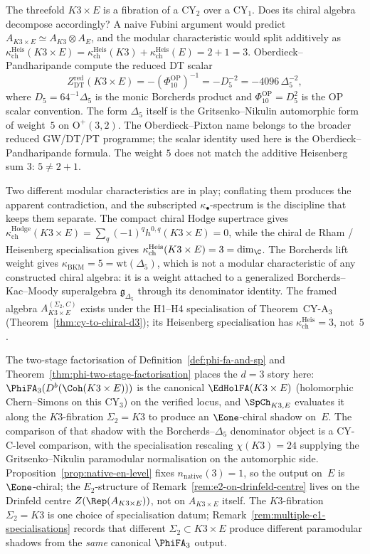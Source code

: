 The threefold $K3 \times E$ is a fibration of a CY$_2$ over a CY$_1$. Does its chiral algebra decompose accordingly? A naive Fubini argument would predict $A_{K3 \times E} \simeq A_{K3} \otimes A_E$, and the modular characteristic would split additively as $\kappa_{\mathrm{ch}}^{\mathrm{Heis}}(K3 \times E) = \kappa_{\mathrm{ch}}^{\mathrm{Heis}}(K3) + \kappa_{\mathrm{ch}}^{\mathrm{Heis}}(E) = 2 + 1 = 3$. Oberdieck--Pandharipande compute the reduced DT scalar
\[
 Z^{\mathrm{red}}_{\mathrm{DT}}(K3\times E)
 =
 -(\Phi_{10}^{\mathrm{OP}})^{-1}
 =
 -D_5^{-2}
 =
 -4096\,\Delta_5^{-2},
\]
where \(D_5=64^{-1}\Delta_5\) is the monic Borcherds product and
\(\Phi_{10}^{\mathrm{OP}}=D_5^2\) is the OP scalar convention. The form
\(\Delta_5\) itself is the Gritsenko--Nikulin automorphic form of
weight~$5$ on $\mathrm{O}^+(3,2)$. The Oberdieck--Pixton name belongs
to the broader reduced GW/DT/PT programme; the scalar identity used
here is the Oberdieck--Pandharipande formula. The weight $5$ does not
match the additive Heisenberg sum $3$: $5 \neq 2 + 1$.

Two different modular characteristics are in play; conflating them produces the apparent contradiction, and the subscripted $\kappa_\bullet$-spectrum is the discipline that keeps them separate. The compact chiral Hodge supertrace gives $\kappa_{\mathrm{ch}}^{\mathrm{Hodge}}(K3 \times E) = \sum_q (-1)^q h^{0, q}(K3 \times E) = 0$, while the chiral de Rham / Heisenberg specialisation gives $\kappa_{\mathrm{ch}}^{\mathrm{Heis}}(K3 \times E) = 3 = \dim_\C$. The Borcherds lift weight gives $\kappa_{\mathrm{BKM}} = 5 = \mathrm{wt}(\Delta_5)$, which is not a modular characteristic of any constructed chiral algebra: it is a weight attached to a generalized Borcherds--Kac--Moody superalgebra $\mathfrak{g}_{\Delta_5}$ through its denominator identity. The framed algebra $A_{K3 \times E}^{(\Sigma_2,C)}$ exists under the H1--H4 specialisation of Theorem~CY-A$_3$ (Theorem~\ref{thm:cy-to-chiral-d3}); its Heisenberg specialisation has $\kappa_{\mathrm{ch}}^{\mathrm{Heis}} = 3$, not~$5$.

The two-stage factorisation of Definition~\ref{def:phi-fa-and-sp} and Theorem~\ref{thm:phi-two-stage-factorisation} places the $d = 3$ story here: $\PhiFA_3(D^b(\Coh(K3 \times E)))$ is the canonical $\EdHolFA(K3 \times E)$ (holomorphic Chern--Simons on this CY$_3$) on the verified locus, and $\SpCh_{K3, E}$ evaluates it along the $K3$-fibration $\Sigma_2 = K3$ to produce an $\Eone$-chiral shadow on~$E$. The comparison of that shadow with the Borcherds--$\Delta_5$ denominator object is a CY-C-level comparison, with the specialisation rescaling $\chi(K3) = 24$ supplying the Gritsenko--Nikulin paramodular normalisation on the automorphic side. Proposition~\ref{prop:native-en-level} fixes $n_{\mathrm{native}}(3) = 1$, so the output on~$E$ is $\Eone$-chiral; the $E_2$-structure of Remark~\ref{rem:e2-on-drinfeld-centre} lives on the Drinfeld centre $Z(\Rep(A_{K3\times E}))$, not on $A_{K3 \times E}$ itself. The $K3$-fibration $\Sigma_2 = K3$ is one choice of specialisation datum; Remark~\ref{rem:multiple-e1-specialisations} records that different $\Sigma_2 \subset K3 \times E$ produce different paramodular shadows from the \emph{same} canonical $\PhiFA_3$ output.

